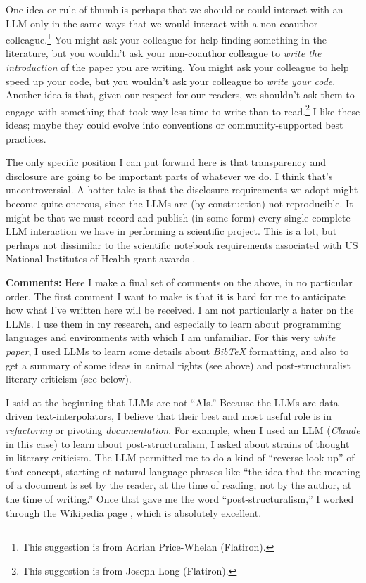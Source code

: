 \documentclass{article}
\newcommand{\documentname}{\textsl{white paper}}
\newcommand{\paragraphskip}{\medskip}
\renewcommand{\paragraph}[1]{\par\paragraphskip\noindent\textbf{#1}}
\begin{document}
One idea or rule of thumb is perhaps that we should or could interact with an LLM only in the same ways that we would interact with a non-coauthor colleague.\footnote{This suggestion is from Adrian Price-Whelan (Flatiron).}
You might ask your colleague for help finding something in the literature, but you wouldn't ask your non-coauthor colleague to \emph{write the introduction} of the paper you are writing.
You might ask your colleague to help speed up your code, but you wouldn't ask your colleague to \emph{write your code}.
Another idea is that, given our respect for our readers, we shouldn't ask them to engage with something that took way less time to write than to read.\footnote{This suggestion is from Joseph Long (Flatiron).}
I like these ideas; maybe they could evolve into conventions or community-supported best practices.

The only specific position I can put forward here is that transparency and disclosure are going to be important parts of whatever we do.
I think that's uncontroversial.
A hotter take is that the disclosure requirements we adopt might become quite onerous, since the LLMs are (by construction) not reproducible.
It might be that we must record and publish (in some form) every single complete LLM interaction we have in performing a scientific project.
This is a lot, but perhaps not dissimilar to the scientific notebook requirements associated with US National Institutes of Health grant awards \cite{nih}.

\paragraph{Comments:}
Here I make a final set of comments on the above, in no particular order.
The first comment I want to make is that it is hard for me to anticipate how what I've written here will be received.
I am not particularly a hater on the LLMs.
I use them in my research, and especially to learn about programming languages and environments with which I am unfamiliar.
For this very \documentname, I used LLMs to learn some details about \textsl{BibTeX} formatting, and also to get a summary of some ideas in animal rights (see above) and post-structuralist literary criticism (see below).

I said at the beginning that LLMs are not ``AIs.''
Because the LLMs are data-driven text-interpolators, I believe that their best and most useful role is in \emph{refactoring} or pivoting \emph{documentation}.
For example, when I used an LLM (\textsl{Claude} in this case) to learn about post-structuralism, I asked about strains of thought in literary criticism.
The LLM permitted me to do a kind of ``reverse look-up'' of that concept, starting at natural-language phrases like ``the idea that the meaning of a document is set by the reader, at the time of reading, not by the author, at the time of writing.''
Once that gave me the word ``post-structuralism,'' I worked through the Wikipedia page \cite{poststructuralism}, which is absolutely excellent.
\end{document}
